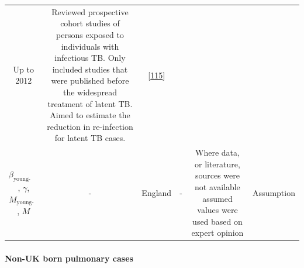 \documentclass[11pt,twoside]{bristolthesis}
\begin{document}
\begin{longtable}[]{@{}cccccc@{}}
\begin{minipage}[t]{0.07\columnwidth}
  Up to
  2012\strut
  \end{minipage} & \begin{minipage}[t]{0.31\columnwidth}\centering
  Reviewed prospective cohort studies of persons
  exposed to individuals with infectious TB. Only
  included studies that were published before the
  widespread treatment of latent TB. Aimed to
  estimate the reduction in re-infection for latent
  TB cases.\strut
  \end{minipage} & \begin{minipage}[t]{0.10\columnwidth}\centering
  {[}\protect\hyperlink{ref-Andrews2012}{115}{]}\strut
  \end{minipage}\tabularnewline
  \begin{minipage}[t]{0.19\columnwidth}\centering
  \(\beta_{\text{young-adult}}\),
  \(\gamma\),
  \(M_{\text{young-adult}}\),
  \(M\)\strut
  \end{minipage} & \begin{minipage}[t]{0.09\columnwidth}\centering
  -\strut
  \end{minipage} & \begin{minipage}[t]{0.07\columnwidth}\centering
  England\strut
  \end{minipage} & \begin{minipage}[t]{0.07\columnwidth}\centering
  -\strut
  \end{minipage} & \begin{minipage}[t]{0.31\columnwidth}\centering
  Where data, or literature, sources were not
  available assumed values were used based on expert
  opinion\strut
  \end{minipage} & \begin{minipage}[t]{0.10\columnwidth}\centering
  Assumption\strut
  \end{minipage}\tabularnewline
  \bottomrule
  \end{longtable}
  \hypertarget{non-uk-born-pulmonary-cases}{%
  \paragraph{Non-UK born pulmonary cases}\label{non-uk-born-pulmonary-cases}}
  
\end{document}
